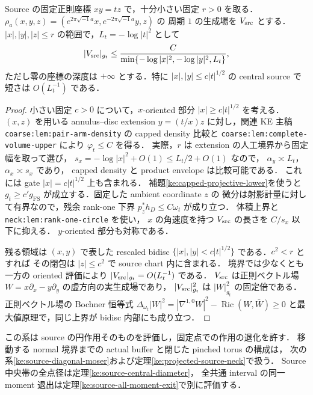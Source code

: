 \begin{corollary}
\label{ke:source-short-circle}
Source の固定正則座標 $xy=tz$ で，十分小さい固定 $r>0$ を取る．
$\rho_a(x,y,z)=(e^{2\pi\sqrt{-1}a}x,e^{-2\pi\sqrt{-1}a}y,z)$ の
周期 $1$ の生成場を $V_{\rm src}$ とする．
$|x|,|y|,|z|\le r$ の範囲で，$L_t=-\log|t|^2$ として
\[
 |V_{\rm src}|_{g_t}
 \le \frac{C}{\min\{-\log|x|^2,-\log|y|^2,L_t\}},
\]
ただし零の座標の深度は $+\infty$ とする．特に
$|x|,|y|\le c|t|^{1/2}$ の central source で短さは $O(L_t^{-1})$ である．
\end{corollary}

\begin{proof}
小さい固定 $c>0$ について，$x$-oriented 部分
$|x|\ge c|t|^{1/2}$ を考える．$(x,z)$ を用いる annulus--disc extension
$y=(t/x)z$ に対し，関連 KE 主稿
\texttt{coarse:lem:pair-arm-density} の capped density 比較と
\texttt{coarse:lem:complete-volume-upper} により $\varphi_t\le C$ を得る．
実際，$r$ は extension の人工境界から固定幅を取って選び，
$s_x=-\log|x|^2+O(1)\le L_t/2+O(1)$ なので，
$\alpha_y\asymp L_t$，$\alpha_x\asymp s_x$ であり，
capped density と product envelope は比較可能である．
これには gate $|x|=c|t|^{1/2}$ 上も含まれる．
補題\ref{ke:capped-projective-lower}を使うと
$g_t\ge c' g_{\mathrm{FS}}$ が成立する．固定した ambient coordinate $z$ の
微分は射影計量に対して有界なので，残余 rank-one 下界
$p_z^*h_D\le C\omega_t$ が成り立つ．
体積上界と \texttt{neck:lem:rank-one-circle} を使い，
$x$ の角速度を持つ $V_{\rm src}$ の長さを $C/s_x$ 以下に抑える．
$y$-oriented 部分も対称である．

残る領域は $(x,y)$ で表した rescaled bidisc
$\{|x|,|y|<c|t|^{1/2}\}$ である．$c^2<r$ とすれば
その閉包は $|z|\le c^2$ で source chart 内に含まれる．
境界では少なくとも一方の oriented 評価により
$|V_{\rm src}|_{g_t}=O(L_t^{-1})$ である．
$V_{\rm src}$ は正則ベクトル場
$W=x\partial_x-y\partial_y$ の虚方向の実生成場であり，
$|V_{\rm src}|_{g_t}^2$ は $|W|_{g_t}^2$ の固定倍である．
正則ベクトル場の Bochner 恒等式
$\Delta_{\omega_t}|W|^2=|\nabla^{1,0}W|^2-\operatorname{Ric}(W,\bar W)\ge0$
と最大値原理で，同じ上界が bidisc 内部にも成り立つ．
\end{proof}

この系は source の円作用そのものを評価し，固定点での作用の退化を許す．
移動する normal 境界までの actual buffer と閉じた pinched torus の構成は，
次の系\ref{ke:source-diagonal-moser}および定理\ref{ke:projected-source-neck}で扱う．
Source 中央帯の全点径は定理\ref{ke:source-central-diameter}，
全共通 interval の同一 moment 退出は定理\ref{ke:source-all-moment-exit}で別に評価する．


